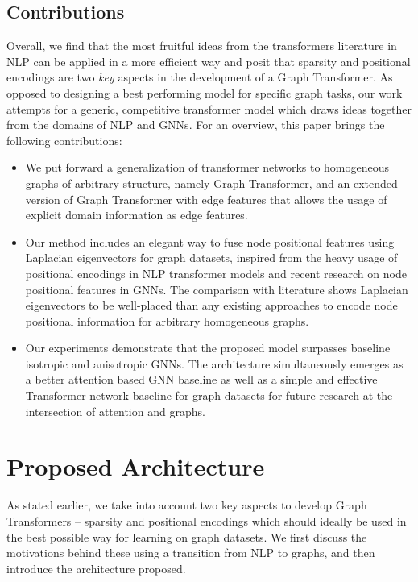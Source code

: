 \documentclass[letterpaper]{article} \usepackage{aaai21}  \usepackage{times}  \usepackage{helvet} \usepackage{courier}  \usepackage[hyphens]{url}  \usepackage{graphicx} \urlstyle{rm} \def\UrlFont{\rm}  \usepackage{natbib}  \usepackage{caption} \usepackage{xcolor}
\begin{document}
\subsection{Contributions}
Overall, we find that the most fruitful ideas from the transformers literature in NLP can be applied in a more efficient way and posit that sparsity and positional encodings are two \textit{key} aspects in the development of a Graph Transformer. 
As opposed to designing a best performing model for specific graph tasks, our work attempts for a generic, competitive transformer model which draws ideas together from the domains of NLP and GNNs.
For an overview, this paper brings the following contributions:
\begin{itemize}
    \item We put forward a generalization of transformer networks to homogeneous graphs of arbitrary structure, namely Graph Transformer, and an extended version of Graph Transformer with edge features that allows the usage of explicit domain information as edge features. 
    \item Our method includes an elegant way to fuse node positional features using Laplacian eigenvectors for graph datasets, inspired from the heavy usage of positional encodings in NLP transformer models and recent research on node positional features in GNNs.
    The comparison with literature shows Laplacian eigenvectors to be well-placed than any existing approaches to encode node positional information for arbitrary homogeneous graphs.
    \item Our experiments demonstrate that the proposed model surpasses baseline isotropic and anisotropic GNNs. The architecture simultaneously emerges as a better attention based GNN baseline as well as a simple and effective Transformer network baseline for graph datasets for future research at the intersection of attention and graphs.
\end{itemize}













\section{Proposed Architecture}
As stated earlier, we take into account two key aspects to develop Graph Transformers -- sparsity and positional encodings which should ideally be used in the best possible way for learning on graph datasets. We first discuss the motivations behind these using a transition from NLP to graphs, and then introduce the architecture proposed.
\end{document}
